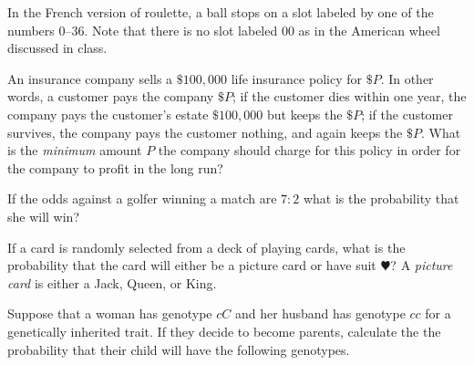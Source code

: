 \documentclass[addpoints,12pt]{exam}
\begin{document}
\begin{questions}

\question[12] In the French version of roulette, a ball stops
on a slot labeled by one of the numbers
$0$--$36$. Note that there is no slot labeled
$00$ as in the American wheel discussed in class.

\question[12] An insurance company sells a $\$100,000$
life insurance policy for $\$P$. 
In other words, a customer pays the company $\$P$;
if the customer dies within one year, the company
pays the customer's estate $\$100,000$ but keeps the $\$P$;
if the customer survives, the company pays the customer nothing, and again
keeps the $\$P$. What is the {\em minimum} amount $P$ the
company should charge for this policy in order
for the company to profit in the long run?

\question[8] If the odds against a golfer winning a match
are $7:2$ what is the probability that she will win?

\question[10] If a card is randomly selected from a deck
of playing cards, what is the probability that the card
will either be a picture card or have suit $\varheart$?
A {\em picture card} is either a Jack, Queen, or King.

\question[12]
Suppose that a woman has genotype $cC$
and her husband has genotype $cc$ for a
genetically inherited trait.
If they decide to become parents, calculate the
the probability that their child will
have the following genotypes.
\end{questions}
\end{document}
